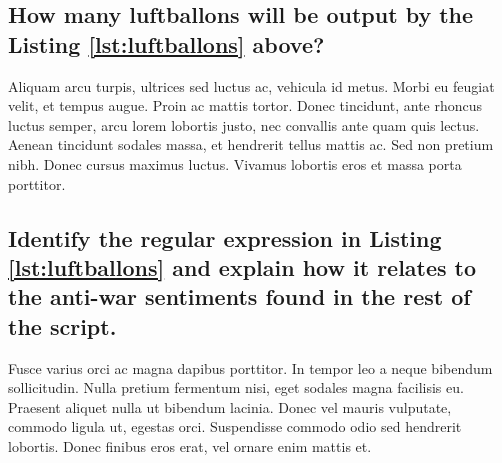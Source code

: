 \documentclass[11pt]{scrartcl} %
\begin{document}

\subsection{How many luftballons will be output by the Listing \ref{lst:luftballons} above?}

Aliquam arcu turpis, ultrices sed luctus ac, vehicula id metus. Morbi eu feugiat velit, et tempus augue. Proin ac mattis tortor. Donec tincidunt, ante rhoncus luctus semper, arcu lorem lobortis justo, nec convallis ante quam quis lectus. Aenean tincidunt sodales massa, et hendrerit tellus mattis ac. Sed non pretium nibh. Donec cursus maximus luctus. Vivamus lobortis eros et massa porta porttitor.


\subsection{Identify the regular expression in Listing \ref{lst:luftballons} and explain how it relates to the anti-war sentiments found in the rest of the script.}

Fusce varius orci ac magna dapibus porttitor. In tempor leo a neque bibendum sollicitudin. Nulla pretium fermentum nisi, eget sodales magna facilisis eu. Praesent aliquet nulla ut bibendum lacinia. Donec vel mauris vulputate, commodo ligula ut, egestas orci. Suspendisse commodo odio sed hendrerit lobortis. Donec finibus eros erat, vel ornare enim mattis et.

\end{document}
